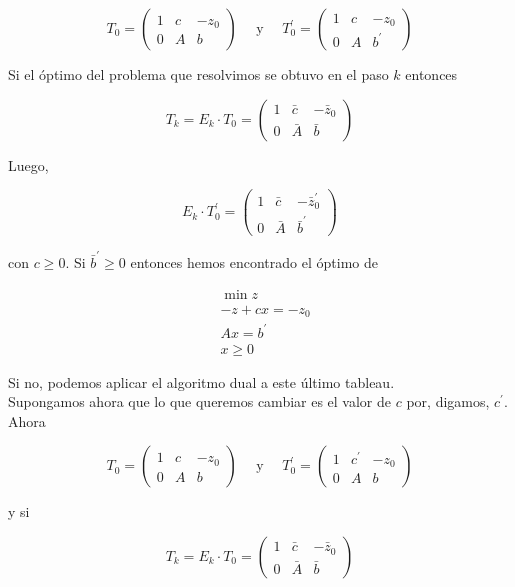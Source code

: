 \documentclass[10pt]{article}
\begin{document}
$$
T_{0}=\left(\begin{array}{cc|c}
1 & c & -z_{0} \\
0 & A & b
\end{array}\right) \quad \text { y } \quad T_{0}^{\prime}=\left(\begin{array}{cc|c}
1 & c & -z_{0} \\
0 & A & b^{\prime}
\end{array}\right)
$$

Si el óptimo del problema que resolvimos se obtuvo en el paso $k$ entonces

$$
T_{k}=E_{k} \cdot T_{0}=\left(\begin{array}{cc|c}
1 & \bar{c} & -\bar{z}_{0} \\
0 & \bar{A} & \bar{b}
\end{array}\right)
$$

Luego,

$$
E_{k} \cdot T_{0}^{\prime}=\left(\begin{array}{cc|c}
1 & \bar{c} & -\bar{z}_{0}^{\prime} \\
0 & \bar{A} & \bar{b}^{\prime}
\end{array}\right)
$$

con $c \geq 0$. Si $\bar{b}^{\prime} \geq 0$ entonces hemos encontrado el óptimo de

$$
\begin{aligned}
& \min z \\
& -z+c x=-z_{0} \\
& A x=b^{\prime} \\
& x \geq 0
\end{aligned}
$$

Si no, podemos aplicar el algoritmo dual a este último tableau.\\
Supongamos ahora que lo que queremos cambiar es el valor de $c$ por, digamos, $c^{\prime}$. Ahora

$$
T_{0}=\left(\begin{array}{cc|c}
1 & c & -z_{0} \\
0 & A & b
\end{array}\right) \quad \text { y } \quad T_{0}^{\prime}=\left(\begin{array}{cc|c}
1 & c^{\prime} & -z_{0} \\
0 & A & b
\end{array}\right)
$$

y si

$$
T_{k}=E_{k} \cdot T_{0}=\left(\begin{array}{cc|c}
1 & \bar{c} & -\bar{z}_{0} \\
0 & \bar{A} & \bar{b}
\end{array}\right)
$$
\end{document}
